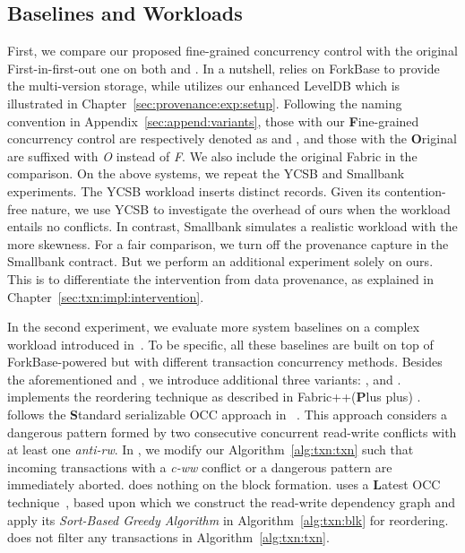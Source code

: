 \subsection{Baselines and Workloads}
First, we compare our proposed fine-grained concurrency control with the original First-in-first-out one on both {\fs} and {\fsPr}. 
In a nutshell, {\fs} relies on ForkBase to provide the multi-version storage, while {\fsPr} utilizes our enhanced LevelDB which is illustrated in Chapter~\ref{sec:provenance:exp:setup}. 
Following the naming convention in Appendix~\ref{sec:append:variants}, those with our \textbf{F}ine-grained concurrency control are respectively denoted as {\fsF} and {\fsPrF}, and those with the \textbf{O}riginal are suffixed with \textit{O} instead of \textit{F}. 
We also include the original Fabric in the comparison. 
On the above systems, we repeat the YCSB and Smallbank experiments. 
The YCSB workload inserts distinct records. 
Given its contention-free nature, we use YCSB to investigate the overhead of ours when the workload entails no conflicts. 
In contrast, Smallbank simulates a realistic workload with the more skewness.
For a fair comparison, we turn off the provenance capture in the Smallbank contract. 
But we perform an additional experiment solely on ours.
This is to differentiate the intervention from data provenance, as explained in Chapter~\ref{sec:txn:impl:intervention}. 

In the second experiment, we evaluate more system baselines on a complex workload introduced in~\cite{sharma2019blurring}. 
To be specific, all these baselines are built on top of ForkBase-powered {\fs} but with different transaction concurrency methods.
Besides the aforementioned {\fsO} and {\fsF}, we introduce additional three variants: {\fsP}, {\fsL} and {\fsS}. 
{\fsP} implements the reordering technique as described in Fabric++(\textbf{P}lus plus) \cite{sharma2019blurring}.
{\fsS} follows the \textbf{S}tandard serializable OCC approach in ~\cite{CahillRF08}. 
This approach considers a dangerous pattern formed by two consecutive concurrent read-write conflicts with at least one \textit{anti-rw}. 
In {\fsS}, we modify our Algorithm~\ref{alg:txn:txn} such that incoming transactions with a \textit{c-ww} conflict or a dangerous pattern are immediately aborted. 
{\fsS} does nothing on the block formation.
{\fsL} uses a \textbf{L}atest OCC technique~\cite{ding2018improving}, based upon which we construct the read-write
dependency graph and apply its \textit{Sort-Based Greedy Algorithm} in Algorithm~\ref{alg:txn:blk} for reordering. 
{\fsL} does not filter any transactions in Algorithm~\ref{alg:txn:txn}.

